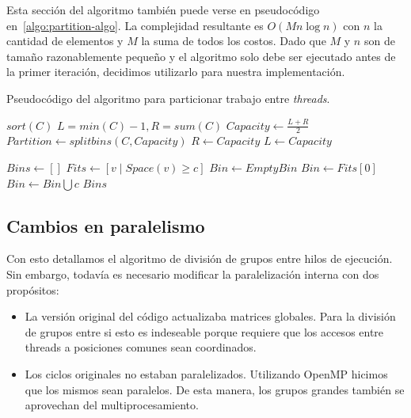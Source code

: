 Esta secci\'on del algoritmo tambi\'en puede verse en pseudoc\'odigo en~\ref{algo:partition-algo}.
La complejidad resultante es $O(M n \log n)$ con $n$ la cantidad de elementos y $M$ la suma
de todos los costos. Dado que $M$ y $n$ son de tama\~no razonablemente peque\~no y el algoritmo
solo debe ser ejecutado antes de la primer iteraci\'on, decidimos utilizarlo para
nuestra implementaci\'on.

\begin{algorithm}[H]
    \caption{Pseudoc\'odigo del algoritmo para particionar trabajo entre \textit{threads}.}
    \label{algo:partition-algo}
    \begin{algorithmic}
            \State $sort(C)$
            \State $L = min(C)-1, R = sum(C)$
                \Comment{Invariante: $(L, \dots, R]$ contiene la capacidad m\'axima.}
                \State $Capacity \gets \frac{L+R}{2}$
                \State $Partition \gets splitbins(C,Capacity)$
                    \State $R \gets Capacity$
                \Else
                    \State $L \gets Capacity$
                \EndIf
            \EndWhile

            \State {}
        \EndFunction

            \State $Bins \gets []$
                \State $Fits \gets [v \mid Space(v) \geq c]$
                    \State $Bin \gets EmptyBin$
                \Else
                    \State $Bin \gets Fits[0]$
                \EndIf
                \State $Bin \gets Bin \bigcup c$
            \EndFor
            \State \Return $Bins$
        \EndFunction
    \end{algorithmic}
\end{algorithm}

\subsection{Cambios en paralelismo}

Con esto detallamos el algoritmo de divisi\'on de grupos entre hilos de ejecuci\'on.
Sin embargo, todav\'ia es necesario modificar la paralelizaci\'on interna con dos
prop\'ositos:

\begin{itemize}
    \item La versi\'on original del c\'odigo actualizaba matrices globales. Para
    la divisi\'on de grupos entre si esto es indeseable porque requiere que los
    accesos entre threads a posiciones comunes sean coordinados.
    \item Los ciclos originales no estaban paralelizados. Utilizando OpenMP
    hicimos que los mismos sean paralelos. De esta manera, los grupos grandes
    tambi\'en se aprovechan del multiprocesamiento.
\end{itemize}


